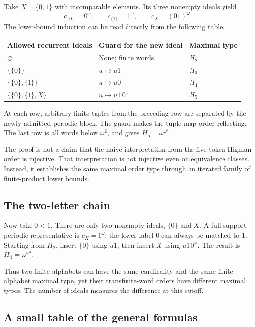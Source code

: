 \documentclass[11pt]{article}
\numberwithin{equation}{section}
\theoremstyle{plain}
\theoremstyle{definition}
\theoremstyle{remark}
\newcommand{\HH}{H}
\begin{document}
Take $X=\{0,1\}$ with incomparable elements. Its three nonempty ideals yield
\[
 c_{\{0\}}=0^\omega,
 \qquad c_{\{1\}}=1^\omega,
 \qquad c_X=(01)^\omega.
\]
The lower-bound induction can be read directly from the following table.

\begin{center}
\begin{tabular}{@{}lll@{}}
\toprule
Allowed recurrent ideals & Guard for the new ideal & Maximal type\\
\midrule
$\varnothing$ & None; finite words & $\HH_2$\\
$\{\{0\}\}$ & $u\mapsto u1$ & $\HH_3$\\
$\{\{0\},\{1\}\}$ & $u\mapsto u0$ & $\HH_4$\\
$\{\{0\},\{1\},X\}$ & $u\mapsto u1\,0^\omega$ & $\HH_5$\\
\bottomrule
\end{tabular}
\end{center}

At each row, arbitrary finite tuples from the preceding row are separated by the newly admitted periodic block. The guard makes the tuple map order-reflecting. The last row is all words below $\omega^2$, and gives $\HH_5=\omega^{\omega^4}$.

The proof is not a claim that the naive interpretation from the five-token Higman order is injective. That interpretation is not injective even on equivalence classes. Instead, it establishes the same maximal order type through an iterated family of finite-product lower bounds.

\subsection{The two-letter chain}

Now take $0<1$. There are only two nonempty ideals, $\{0\}$ and $X$. A full-support periodic representative is $c_X=1^\omega$: the lower label $0$ can always be matched to $1$. Starting from $\HH_2$, insert $\{0\}$ using $u1$, then insert $X$ using $u1\,0^\omega$. The result is $\HH_4=\omega^{\omega^3}$.

Thus two finite alphabets can have the same cardinality and the same finite-alphabet maximal type, yet their transfinite-word orders have different maximal types. The number of ideals measures the difference at this cutoff.

\subsection{A small table of the general formulas}
\end{document}
